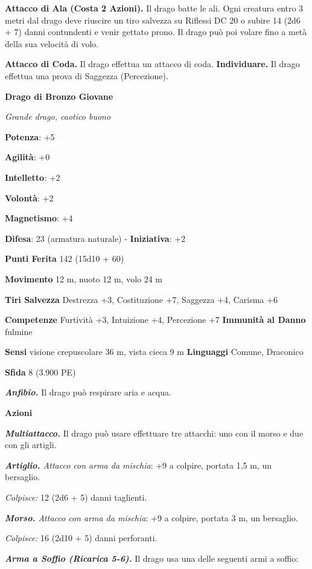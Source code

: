 \begin{multicols}{2}
\textbf{Attacco di Ala (Costa 2 Azioni).} Il drago batte le ali. Ogni
creatura entro 3 metri dal drago deve riuscire un tiro salvezza su Riflessi DC 20 o subire 14 (2d6 + 7) danni contundenti e venir gettato
prono. Il drago può poi volare fino a metà della sua velocità di volo.

\textbf{Attacco di Coda.} Il drago effettua un attacco di coda.
\textbf{Individuare.} Il drago effettua una prova di Saggezza
(Percezione).



\textbf{Drago di Bronzo Giovane}

\emph{Grande drago, caotico buono}

\textbf{Potenza}: +5

\textbf{Agilità}: +0

\textbf{Intelletto}: +2

\textbf{Volontà}: +2

\textbf{Magnetismo}: +4

\textbf{Difesa}: 23 (armatura naturale) - \textbf{Iniziativa}: +2

\textbf{Punti Ferita} 142 (15d10 + 60)

\textbf{Movimento} 12 m, nuoto 12 m, volo 24 m

\textbf{Tiri Salvezza} Destrezza +3, Costituzione +7, Saggezza +4,
Carisma +6

\textbf{Competenze} Furtività +3, Intuizione +4, Percezione +7
\textbf{Immunità al Danno} fulmine

\textbf{Sensi} visione crepuscolare 36 m, vista cieca 9 m
\textbf{Linguaggi} Comune, Draconico

\textbf{Sfida} 8 (3.900 PE)

\emph{\textbf{Anfibio.}} Il drago può respirare aria e acqua.

\textbf{Azioni}

\emph{\textbf{Multiattacco.}} Il drago può usare effettuare tre
attacchi: uno con il morso e due con gli artigli.

\emph{\textbf{Artiglio.} Attacco con arma da mischia}: +9 a colpire,
portata 1,5 m, un bersaglio.

\emph{Colpisce:} 12 (2d6 + 5) danni taglienti.

\emph{\textbf{Morso.} Attacco con arma da mischia}: +9 a colpire,
portata 3 m, un bersaglio.

\emph{Colpisce:} 16 (2d10 + 5) danni perforanti.

\emph{\textbf{Arma a Soffio (Ricarica 5-6).}} Il drago usa una delle
seguenti armi a soffio:


\end{multicols}

